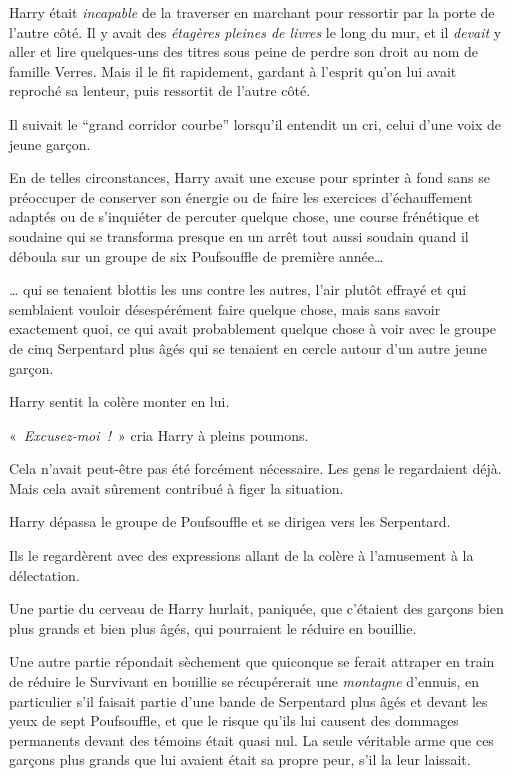 Harry était \emph{incapable} de la traverser en marchant pour ressortir par la porte de l'autre côté.
Il y avait des \emph{étagères pleines de livres} le long du mur, et il \emph{devait} y aller et lire quelques-uns des titres sous peine de perdre son droit au nom de famille Verres.
Mais il le fit rapidement, gardant à l'esprit qu'on lui avait reproché sa lenteur, puis ressortit de l'autre côté.

Il suivait le “grand corridor courbe” lorsqu'il entendit un cri, celui d'une voix de jeune garçon.

En de telles circonstances, Harry avait une excuse pour sprinter à fond sans se préoccuper de conserver son énergie ou de faire les exercices d'échauffement adaptés ou de s'inquiéter de percuter quelque chose, une course frénétique et soudaine qui se transforma presque en un arrêt tout aussi soudain quand il déboula sur un groupe de six Poufsouffle de première année…

… qui se tenaient blottis les uns contre les autres, l'air plutôt effrayé et qui semblaient vouloir désespérément faire quelque chose, mais sans savoir exactement quoi, ce qui avait probablement quelque chose à voir avec le groupe de cinq Serpentard plus âgés qui se tenaient en cercle autour d'un autre jeune garçon.

Harry sentit la colère monter en lui.

«~\emph{Excusez-moi~!}~» cria Harry à pleins poumons.

Cela n'avait peut-être pas été forcément nécessaire.
Les gens le regardaient déjà. Mais cela avait sûrement contribué à figer la situation.

Harry dépassa le groupe de Poufsouffle et se dirigea vers les Serpentard.

Ils le regardèrent avec des expressions allant de la colère à l'amusement à la délectation.

Une partie du cerveau de Harry hurlait, paniquée, que c'étaient des garçons bien plus grands et bien plus âgés, qui pourraient le réduire en bouillie.

Une autre partie répondait sèchement que quiconque se ferait attraper en train de réduire le Survivant en bouillie se récupérerait une \emph{montagne} d'ennuis, en particulier s'il faisait partie d'une bande de Serpentard plus âgés et devant les yeux de sept Poufsouffle, et que le risque qu'ils lui causent des dommages permanents devant des témoins était quasi nul.
La seule véritable arme que ces garçons plus grands que lui avaient était sa propre peur, s'il la leur laissait.

